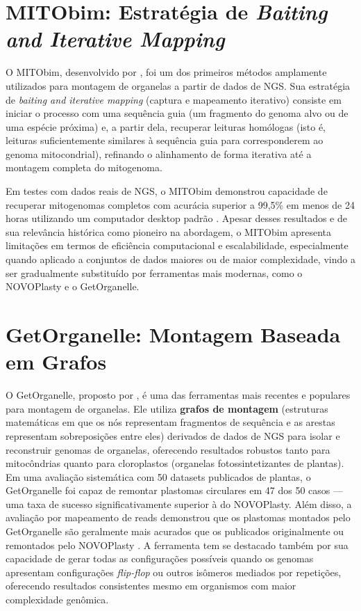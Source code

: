 \section{MITObim: Estratégia de \textit{Baiting and Iterative \mbox{Mapping}}}

O MITObim, desenvolvido por , foi um dos primeiros métodos amplamente utilizados para montagem de organelas a partir de dados de NGS. Sua estratégia de \textit{baiting and iterative mapping} (captura e mapeamento iterativo) consiste em iniciar o processo com uma sequência guia (um fragmento do genoma alvo ou de uma espécie próxima) e, a partir dela, recuperar leituras homólogas (isto é, leituras suficientemente similares à sequência guia para corresponderem ao genoma mitocondrial), refinando o alinhamento de forma iterativa até a montagem completa do mitogenoma.

Em testes com dados reais de NGS, o MITObim demonstrou capacidade de recuperar mitogenomas completos com acurácia superior a 99,5\% em menos de 24 horas utilizando um computador desktop padrão \cite{hahn2013}. Apesar desses resultados e de sua relevância histórica como pioneiro na abordagem, o MITObim apresenta limitações em termos de eficiência computacional e escalabilidade, especialmente quando aplicado a conjuntos de dados maiores ou de maior complexidade, vindo a ser gradualmente substituído por ferramentas mais modernas, como o NOVOPlasty e o GetOrganelle.

\section{GetOrganelle: Montagem Baseada em Grafos}

O GetOrganelle, proposto por , é uma das ferramentas mais recentes e populares para montagem de organelas. Ele utiliza \textbf{grafos de montagem} (estruturas matemáticas em que os nós representam fragmentos de sequência e as arestas representam sobreposições entre eles) derivados de dados de NGS para isolar e reconstruir genomas de organelas, oferecendo resultados robustos tanto para mitocôndrias quanto para cloroplastos (organelas fotossintetizantes de plantas). Em uma avaliação sistemática com 50 datasets publicados de plantas, o GetOrganelle foi capaz de remontar plastomas circulares em 47 dos 50 casos --- uma taxa de sucesso significativamente superior à do NOVOPlasty. Além disso, a avaliação por mapeamento de reads demonstrou que os plastomas montados pelo GetOrganelle são geralmente mais acurados que os publicados originalmente ou remontados pelo NOVOPlasty \cite{jin2020}. A ferramenta tem se destacado também por sua capacidade de gerar todas as configurações possíveis quando os genomas apresentam configurações \textit{flip-flop} ou outros isômeros mediados por repetições, oferecendo resultados consistentes mesmo em organismos com maior complexidade genômica.

